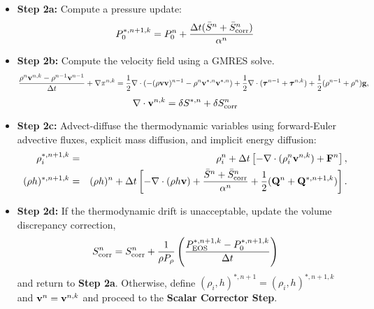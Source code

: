 \documentclass[final]{siamltex}
\def\Fb {{\bf F}}
\def\gb {{\bf g}}
\def\Qb {{\bf Q}}
\def\vb {{\bf v}}
\def\taub   {\boldsymbol{\tau}}
\def\half   {\frac{1}{2}}
\begin{document}
\begin{itemize}
\item {\bf Step 2a:} Compute a pressure update:
\begin{equation}
P_0^{*,n+1,k} = P_0^n + \frac{\Delta t(\bar{S}^n + \bar{S}_{\rm corr}^n)}{\alpha^n}
\end{equation}
\item {\bf Step 2b:} Compute the velocity field using a GMRES solve.
\begin{equation}
\frac{\rho^n\vb^{n,k} - \rho^{n-1}\vb^{n-1}}{\Delta t} + \nabla\pi^{n,k} = \half\nabla\cdot(-(\rho\vb\vb)^{n-1} - \rho^n\vb^{*,n}\vb^{*,n}) + \frac{1}{2}\nabla\cdot(\taub^{n-1} + \taub^{n,k}) + \frac{1}{2}(\rho^{n-1} + \rho^n)\gb,
\end{equation}
\begin{equation}
\nabla\cdot\vb^{n,k} = \delta S^{*,n} + \delta S_{\rm corr}^n
\end{equation}
\item {\bf Step 2c:} Advect-diffuse the thermodynamic variables using forward-Euler advective fluxes,
explicit mass diffusion, and implicit energy diffusion:
\begin{eqnarray}
\rho_i^{*,n+1,k} &=& \rho_i^n + \Delta t\left[-\nabla\cdot(\rho_i^n\vb^{n,k}) + \Fb^n\right], \\
(\rho h)^{*,n+1,k} &=& (\rho h)^n + \Delta t\left[-\nabla\cdot(\rho h\vb) + \frac{\bar{S}^n + \bar{S}_{\rm corr}^n}{\alpha^n} + \frac{1}{2}(\Qb^n + \Qb^{*,n+1,k})\right].\nonumber\\
\end{eqnarray}
\item {\bf Step 2d:} If the thermodynamic drift is unacceptable, update the volume 
discrepancy correction,
\begin{equation}
S_{\rm corr}^n = S_{\rm corr}^n + \frac{1}{\rho P_\rho}\left(\frac{P_{\rm EOS}^{*,n+1,k} - P_0^{*,n+1,k}}{\Delta t}\right)
\end{equation}
and return to {\bf Step 2a}.  Otherwise, define 
$(\rho_i,h)^{*,n+1} = (\rho_i,h)^{*,n+1,k}$ and $\vb^n = \vb^{n,k}$ and proceed to 
the {\bf Scalar Corrector Step}.\\
\end{itemize}
\end{document}
